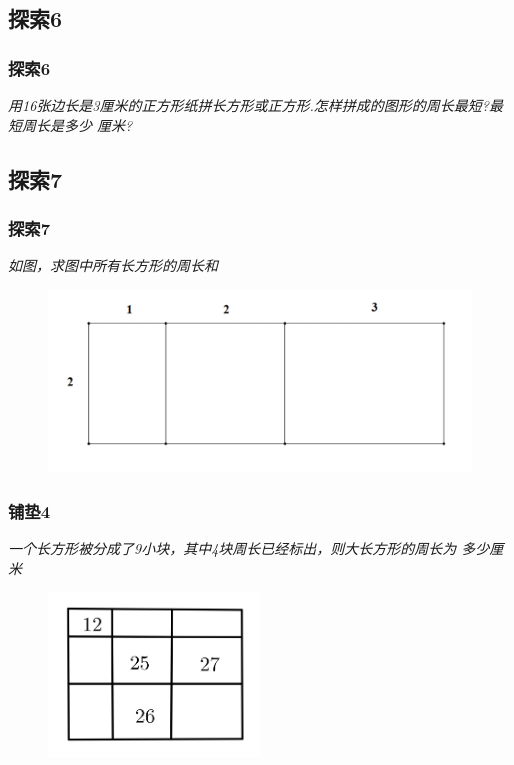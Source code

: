 \subsection{探索6}
\begin{frame}
    \frametitle{探索6}
    \textit{用16张边长是3厘米的正方形纸拼长方形或正方形.怎样拼成的图形的周长最短?最短周长是多少
    厘米?}
\end{frame}

\subsection{探索7}
\begin{frame}
    \frametitle{探索7}
    \textit{如图，求图中所有长方形的周长和}
    \begin{figure}[H] 
        \centering
        \includegraphics[width=1\textwidth]{./pics/Chapter_1/tansuo7.png}
    \end{figure}
\end{frame}

\begin{frame}
    \frametitle{铺垫4}
    \textit{一个长方形被分成了9小块，其中4块周长已经标出，则大长方形的周长为
    多少厘米}
    \begin{figure}[H] 
        \centering
        \includegraphics[width=0.5\textwidth]{./pics/Chapter_1/pudian4.png}
    \end{figure}
\end{frame}

